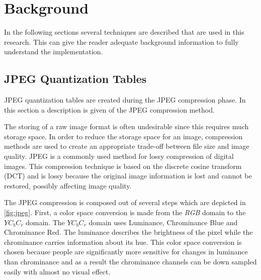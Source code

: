 
\chapter{Background} %

\label{ch:background} %

In the following sections several techniques are described that are used in this research. This can give the reader adequate background information to fully understand the implementation.


\section{JPEG Quantization Tables}\label{sec:dqt}
JPEG quantization tables are created during the JPEG compression phase. In this section a description is given of the JPEG compression method.

The storing of a raw image format is often undesirable since this requires much storage space. In order to reduce the storage space for an image, compression methods are used to create an appropriate trade-off between file size and image quality. JPEG is a commonly used method for lossy compression of digital images. This compression technique is based on the discrete cosine transform (DCT) and is lossy because the original image information is lost and cannot be restored, possibly affecting image quality. 

The JPEG compression is composed out of several steps which are depicted in \autoref{fig:jpeg}. First, a color space conversion is made from the \textit{RGB} domain to the $YC_bC_r$  domain. The $YC_bC_r$ domain uses Luminance, Chrominance Blue and Chrominance Red. The luminance describes the brightness of the pixel while the chrominance carries information about its hue. This color space conversion is chosen because people are significantly more sensitive for changes in luminance than chrominance and as a result the chrominance channels can be down sampled easily with almost no visual effect. 


